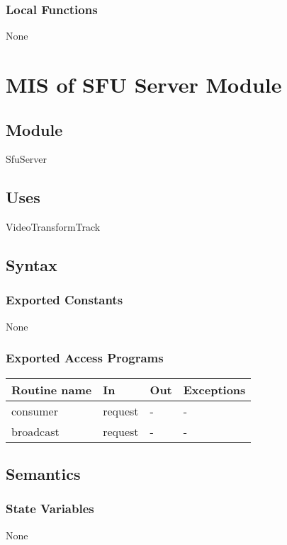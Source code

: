 \documentclass[12pt, titlepage]{article}
\begin{document}
\subsubsection{Local Functions}
None

\section{MIS of SFU Server Module}
\label{sec:sfuserver}

\subsection{Module}
SfuServer

\subsection{Uses}
VideoTransformTrack

\subsection{Syntax}

\subsubsection{Exported Constants}
None

\subsubsection{Exported Access Programs}
\begin{table}[h!]
  \centering
  \begin{tabular}{llll}
    \toprule
    \textbf{Routine name} & \textbf{In} & \textbf{Out} & \textbf{Exceptions} \\
    \midrule
    consumer & request & - & - \\
    broadcast & request & - & - \\
    \bottomrule
  \end{tabular}
\end{table}

\subsection{Semantics}

\subsubsection{State Variables}
None
\end{document}
